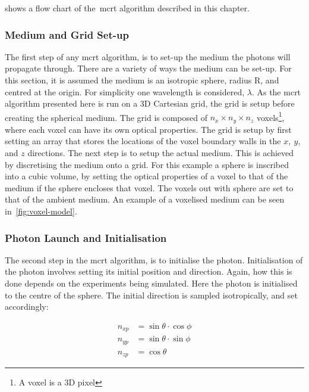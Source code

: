 shows a flow chart of the~\gls*{mcrt} algorithm described in this chapter.


\subsubsection*{Medium and Grid Set-up}\label{sec:algomedium}
The first step of any \gls*{mcrt} algorithm, is to set-up the medium the photons will propagate through. There are a variety of ways the medium can be set-up. For this section, it is assumed the medium is an isotropic sphere, radius R, and centred at the origin. For simplicity one wavelength is considered, $\lambda$. As the \gls*{mcrt} algorithm presented here is run on a 3D Cartesian grid, the grid is setup before creating the spherical medium. The grid is composed of $n_x \times n_y \times n_z$ voxels\footnote{A voxel is a 3D pixel}, where each voxel can have its own optical properties.
The grid is setup by first setting an array that stores the locations of the voxel boundary walls in the $x,\ y$, and $z$ directions. 
The next step is to setup the actual medium. This is achieved by discretising the medium onto a grid. 
For this example a sphere is inscribed into a cubic volume, by setting the optical properties of a voxel to that of the medium if the sphere encloses that voxel. The voxels out with sphere are set to that of the ambient medium. An example of a voxelised medium can be seen in~\cref{fig:voxel-model}. 



\subsubsection*{Photon Launch and Initialisation}\label{sec:photlaunch}

The second step in the \gls*{mcrt} algorithm, is to initialise the photon. Initialisation of the photon involves setting its initial position and direction. Again, how this is done depends on the experiments being simulated. Here the photon is initialised to the centre of the sphere. The initial direction is sampled isotropically, and set accordingly:

\begin{align}
n_{xp}&=\sin\theta \cdot \cos\phi \label{eqn:dirvec1}\\
n_{yp}&=\sin\theta \cdot \sin\phi \label{eqn:dirvec2}\\
n_{zp}&=\cos\theta \label{eqn:dirvec3}
\end{align}


